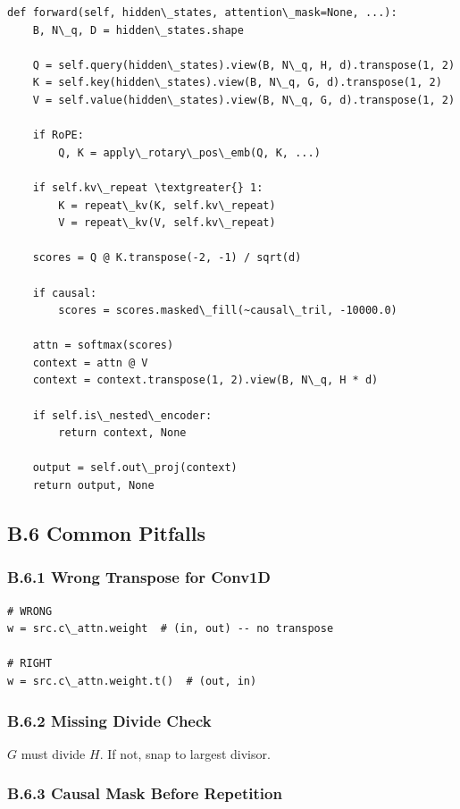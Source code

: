 \begin{lstlisting}
def forward(self, hidden\_states, attention\_mask=None, ...):
    B, N\_q, D = hidden\_states.shape
    
    Q = self.query(hidden\_states).view(B, N\_q, H, d).transpose(1, 2)
    K = self.key(hidden\_states).view(B, N\_q, G, d).transpose(1, 2)
    V = self.value(hidden\_states).view(B, N\_q, G, d).transpose(1, 2)
    
    if RoPE:
        Q, K = apply\_rotary\_pos\_emb(Q, K, ...)
    
    if self.kv\_repeat \textgreater{} 1:
        K = repeat\_kv(K, self.kv\_repeat)
        V = repeat\_kv(V, self.kv\_repeat)
    
    scores = Q @ K.transpose(-2, -1) / sqrt(d)
    
    if causal:
        scores = scores.masked\_fill(~causal\_tril, -10000.0)
    
    attn = softmax(scores)
    context = attn @ V
    context = context.transpose(1, 2).view(B, N\_q, H * d)
    
    if self.is\_nested\_encoder:
        return context, None
    
    output = self.out\_proj(context)
    return output, None
\end{lstlisting}

\subsection{B.6 Common Pitfalls}

\subsubsection{B.6.1 Wrong Transpose for Conv1D}

\begin{lstlisting}
# WRONG
w = src.c\_attn.weight  # (in, out) -- no transpose

# RIGHT
w = src.c\_attn.weight.t()  # (out, in)
\end{lstlisting}

\subsubsection{B.6.2 Missing Divide Check}

$G$ must divide $H$. If not, snap to largest divisor.

\subsubsection{B.6.3 Causal Mask Before Repetition}

